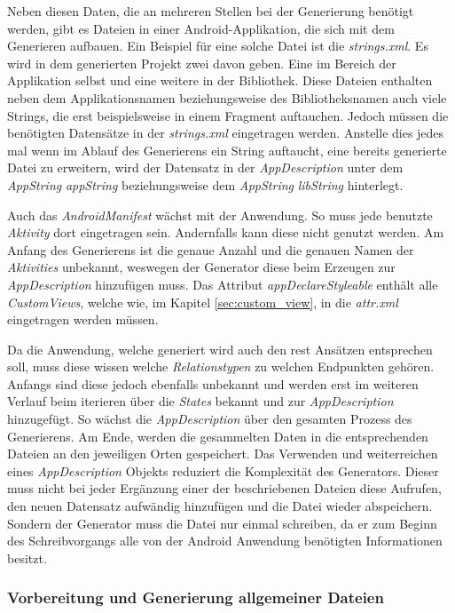 \newpage

Neben diesen Daten, die an mehreren Stellen bei der Generierung benötigt werden, gibt es Dateien in einer Android-Applikation, die sich mit dem Generieren aufbauen. Ein Beispiel für eine solche Datei ist die \textit{strings.xml}. 
Es wird in dem generierten Projekt zwei davon geben. Eine im Bereich der Applikation selbst und eine weitere in der Bibliothek. Diese Dateien enthalten neben dem Applikationsnamen beziehungsweise des Bibliotheksnamen auch viele Strings, die erst beispielsweise in einem Fragment auftauchen. Jedoch müssen die benötigten Datensätze in der \textit{strings.xml} eingetragen werden. Anstelle dies jedes mal wenn im Ablauf des Generierens ein String auftaucht, eine bereits generierte Datei zu erweitern, wird der Datensatz in der \textit{AppDescription} unter dem \textit{AppString} \textit{appString} beziehungsweise dem \textit{AppString} \textit{libString} hinterlegt.

Auch das \textit{AndroidManifest} wächst mit der Anwendung. So muss jede benutzte \textit{Aktivity} dort eingetragen sein. Andernfalls kann diese nicht genutzt werden. Am Anfang des Generierens ist die genaue Anzahl und die genauen Namen der \textit{Aktivities} unbekannt, weswegen der Generator diese beim Erzeugen zur \textit{AppDescription} hinzufügen muss. 
Das Attribut \textit{appDeclareStyleable} enthält alle \textit{CustomViews}, welche wie, im Kapitel \ref{sec:custom_view}, in die \textit{attr.xml} eingetragen werden müssen.

Da die Anwendung, welche generiert wird auch den \acf{rest} Ansätzen entsprechen soll, muss diese wissen welche \textit{Relationstypen} zu welchen Endpunkten gehören. Anfangs sind diese jedoch ebenfalls unbekannt und werden erst im weiteren Verlauf beim iterieren über die \textit{States} bekannt und zur \textit{AppDescription} hinzugefügt.
So wächst die \textit{AppDescription} über den gesamten Prozess des Generierens. Am Ende, werden die gesammelten Daten in die entsprechenden Dateien an den jeweiligen Orten gespeichert. Das Verwenden und weiterreichen eines \textit{AppDescription} Objekts reduziert die Komplexität des Generators. Dieser muss nicht bei jeder Ergänzung einer der beschriebenen Dateien diese Aufrufen, den neuen Datensatz aufwändig hinzufügen und die Datei wieder abspeichern. Sondern der Generator muss die Datei nur einmal schreiben, da er zum Beginn des Schreibvorgangs alle von der Android Anwendung benötigten Informationen besitzt.

\subsubsection{Vorbereitung und Generierung allgemeiner Dateien}

